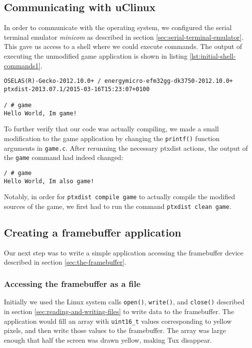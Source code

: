 \subsection{Communicating with uClinux}
In order to communicate with the operating system, we configured the serial terminal emulator \emph{minicom} as described in section \ref{sec:serial-terminal-emulator}. This gave us access to a shell where we could execute commands. The output of executing the unmodified game application is shown in listing \ref{lst:initial-shell-commands1}.
\lstset{style=lststyle-terminal}
\begin{lstlisting}[caption=The original game application,label=lst:initial-shell-commands1]
OSELAS(R)-Gecko-2012.10.0+ / energymicro-efm32gg-dk3750-2012.10.0+
ptxdist-2013.07.1/2015-03-16T15:23:07+0100

/ # game
Hello World, Im game!
\end{lstlisting}

To further verify that our code was actually compiling, we made a small modification to the game application by changing the \texttt{printf()} function arguments in \texttt{game.c}. After rerunning the necessary ptxdist actions, the output of the \texttt{game} command had indeed changed:
\lstset{style=lststyle-terminal}
\begin{lstlisting}[caption=A modified game application,label=lst:initial-shell-commands2]
/ # game
Hello World, Im also game!
\end{lstlisting}
Notably, in order for \texttt{ptxdist compile game} to actually compile the modified sources of the game, we first had to run the command \texttt{ptxdist clean game}.

\subsection{Creating a framebuffer application}
Our next step was to write a simple application accessing the framebuffer device described in section \ref{sec:the-framebuffer}.

\subsubsection{Accessing the framebuffer as a file}
Initially we used the Linux system calls \texttt{open()}, \texttt{write()}, and \texttt{close()} described in section \ref{sec:reading-and-writing-files} to write data to the framebuffer. The application would fill an array with \texttt{uint16\_t} values corresponding to yellow pixels, and then write those values to the framebuffer. The array was large enough that half the screen was drawn yellow, making Tux disappear. 

